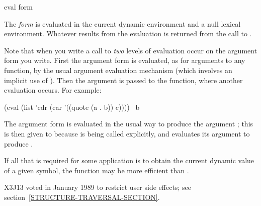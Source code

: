 \begin{defun}[Function]
eval form

The {\it form} is evaluated in the current dynamic environment and
a null lexical environment.  Whatever results from the evaluation
is returned from the call to .

Note that when you write a call to  {\it two} levels
of evaluation occur on the argument form you write.
First the argument form is evaluated, as for arguments to any function,
by the usual argument evaluation mechanism
(which involves an implicit use of ).  Then the argument
is passed to the  function, where another evaluation occurs.
For example:
\begin{lisp}
(eval (list 'cdr (car '((quote (a . b)) c)))) \EV\ b
\end{lisp}
The argument form  is evaluated
in the usual way to produce the argument ;
this is then given to  because  is being called explicitly,
and  evaluates its argument  to produce .

If all that is required for some application is
to obtain the current dynamic value of a given symbol, the function
 may be more efficient than .

\begin{new}
X3J13 voted in January 1989
to restrict user side effects; see section~\ref{STRUCTURE-TRAVERSAL-SECTION}.
\end{new}
\end{defun}

